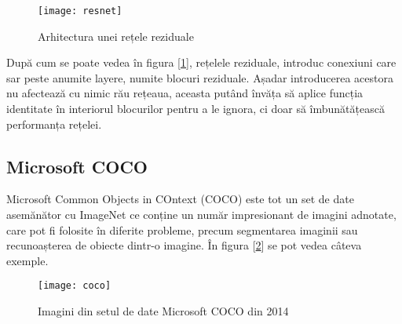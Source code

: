 \begin{figure}[H]
		\centering
        \texttt{[image: resnet]}
        \caption{Arhitectura unei rețele reziduale \cite{res_net}}
        \label{fig:resnet}
\end{figure}

După cum se poate vedea în figura [\ref{fig:resnet}], rețelele reziduale, introduc conexiuni care sar peste anumite layere, numite blocuri reziduale. Așadar introducerea acestora nu afectează cu nimic rău rețeaua, aceasta putând învăța să aplice funcția identitate în interiorul blocurilor pentru a le ignora, ci doar să îmbunătățească performanța rețelei.

\subsection{Microsoft COCO}
\label{sb:microsoft_coco}
Microsoft Common Objects in COntext (COCO) \cite{microsoft_coco} este tot un set de date asemănător cu ImageNet ce conține un număr impresionant de imagini adnotate, care pot fi folosite în diferite probleme, precum segmentarea imaginii sau recunoașterea de obiecte dintr-o imagine. În figura [\ref{fig:coco}] se pot vedea câteva exemple.

\begin{figure}[H]
		\centering
        \texttt{[image: coco]}
        \caption{Imagini din setul de date Microsoft COCO din 2014}
        \label{fig:coco}
\end{figure}

